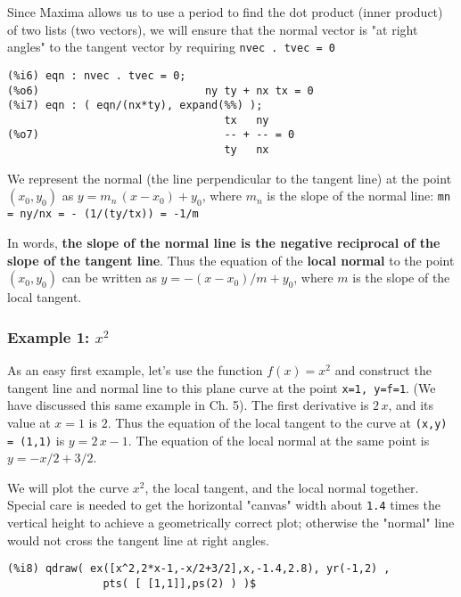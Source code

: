 \documentclass[12pt]{article}
\begin{document}
Since Maxima allows us to use a period to find the dot product (inner product) of two
  lists (two vectors), we will ensure that the normal vector is "at right angles" to
  the tangent vector by requiring \verb|nvec . tvec = 0|
\small
\begin{verbatim}
(%i6) eqn : nvec . tvec = 0;
(%o6)                          ny ty + nx tx = 0
(%i7) eqn : ( eqn/(nx*ty), expand(%%) );
                                  tx   ny
(%o7)                             -- + -- = 0
                                  ty   nx
\end{verbatim}
\normalsize
We represent the normal  (the line perpendicular to the tangent line) 
  at the point $(x_{0},y_{0})$ as
  $y  = m_{n}\,(x - x_{0}) +  y_{0}$, where $m_{n}$ is the slope of the
  normal line: \verb|mn = ny/nx = - (1/(ty/tx)) = -1/m |

\smallskip
In words, \textbf{the slope of the normal line is the negative reciprocal of the slope of
  the tangent line}.
\smallskip
 Thus the equation of the \textbf{local normal} to the point $(x_0,y_0)$ can be written
   as $y =  -(x - x_0)/m + y_0$, where $m$ is the slope of the local tangent.

\subsubsection{Example 1: $x^2$}
As an easy first example, let's use the function $f(x) = x^2$ and construct the
  tangent line and normal line to this plane curve at the point \verb|x=1, y=f=1|.
(We have discussed this same example in Ch. 5).
The first derivative is $2\,x$, and its value at $x=1$ is $2$.
 Thus the equation of the local tangent to the curve at \verb|(x,y) = (1,1)| is
   $y = 2\,x - 1$.
The equation of the local normal at the same point is $y =  -x/2 + 3/2$.

\smallskip
We will plot the curve $x^2$, the local tangent, and the local normal together.
Special care is needed to get the horizontal "canvas" width about \verb|1.4| times
  the vertical height to achieve a geometrically correct plot; otherwise the "normal" line
  would not cross the tangent line at right angles.
\small
\begin{verbatim}
(%i8) qdraw( ex([x^2,2*x-1,-x/2+3/2],x,-1.4,2.8), yr(-1,2) ,
               pts( [ [1,1]],ps(2) ) )$
\end{verbatim}
\normalsize
\newpage
\end{document}
